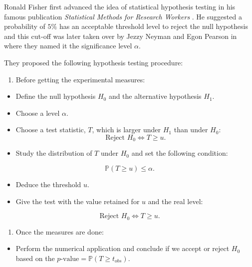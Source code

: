 \documentclass[]{book}
\providecommand{\tightlist}{%
  \setlength{\itemsep}{0pt}\setlength{\parskip}{0pt}}
\begin{document}
Ronald Fisher first advanced the idea of statistical hypothesis testing
in his famous publication \emph{Statistical Methods for Research Workers}
\citep{fisher1935statistical}. He suggested a probability of \(5\%\) has an
acceptable threshold level to reject the null hypothesis and this
cut-off was later taken over by Jezzy Neyman and Egon Pearson in
\citep{neyman1933testing} where they named it the significance level
\(\alpha\).

They proposed the following hypothesis testing procedure:

\begin{enumerate}
\def\labelenumi{(\alph{enumi})}
\tightlist
\item
  Before getting the experimental measures:
\end{enumerate}

\begin{itemize}
\item
  Define the null hypothesis \(H_0\) and the alternative hypothesis
  \(H_1\).
\item
  Choose a level \(\alpha\).
\item
  Choose a test statistic, \(T\), which is larger under \(H_1\) than under \(H_0\): \[\text{Reject } H_0 \Leftrightarrow  T \geq u.\]
\item
  Study the distribution of \(T\) under \(H_0\) and set the following condition:
\end{itemize}

\[\mathbb{P}(T \geq u) \leq \alpha .\]

\begin{itemize}
\item
  Deduce the threshold \(u\).
\item
  Give the test with the value retained for \(u\) and the real level:
\end{itemize}

\[ \text{Reject } H_0 \Leftrightarrow  T \geq u .\]

\begin{enumerate}
\def\labelenumi{(\alph{enumi})}
\setcounter{enumi}{1}
\tightlist
\item
  Once the measures are done:
\end{enumerate}

\begin{itemize}
\tightlist
\item
  Perform the numerical application and conclude if we accept or reject \(H_0\) based on the \(p\text{-value} = \mathbb{P}(T \geq t_{obs})\).
\end{itemize}
\end{document}
